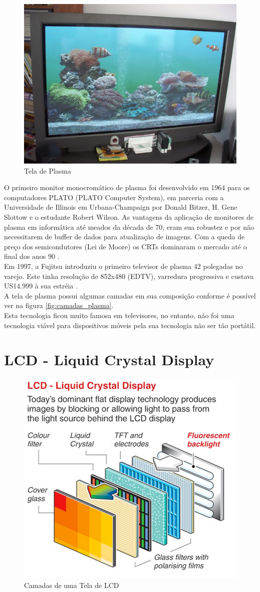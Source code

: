 \begin{figure}[!ht]
  \centering
  \includegraphics[width=.40\textwidth]{./figuras/plasma_display} 
  \caption{Tela de Plasma}
  \label{fig:plasma_display} 
\end{figure}

O primeiro monitor monocromático de plasma foi desenvolvido em 1964 para os computadores PLATO (PLATO Computer System), em parceria com a Universidade de Illinois em Urbana-Champaign por Donald Bitzer, H. Gene Slottow e o estudante Robert Wilson. As vantagens da aplicação de monitores de plasma em informática até meados da década de 70, eram sua robustez e por não necessitarem de buffer de dados para atualização de imagens. Com a queda de preço dos semicondutores (Lei de Moore) os CRTs dominaram o mercado até o final dos anos 90 \cite{WikipediaTelaPlasma}.\\

Em 1997, a Fujitsu introduziu o primeiro televisor de plasma 42 polegadas no varejo. Este tinha resolução de 852x480 (EDTV), varredura progressiva e custava US14.999 à sua estréia \cite{WikipediaTelaPlasma}.\\

A tela de plasma possui algumas camadas em sua composição conforme é possível ver na figura \ref{fig:camadas_plasma}.\\

Esta tecnologia ficou muito famosa em televisores, no entanto, não foi uma tecnologia viável para dispositivos móveis pela sua tecnologia não ser tão portátil. 


\section{LCD - Liquid Crystal Display}
\label{sec:lcd}

\begin{figure}[!ht]
  \centering
  \includegraphics[width=.40\textwidth]{./figuras/camadas_lcd} 
  \caption{Camadas de uma Tela de LCD}
  \label{fig:camadas_lcd} 
\end{figure}

